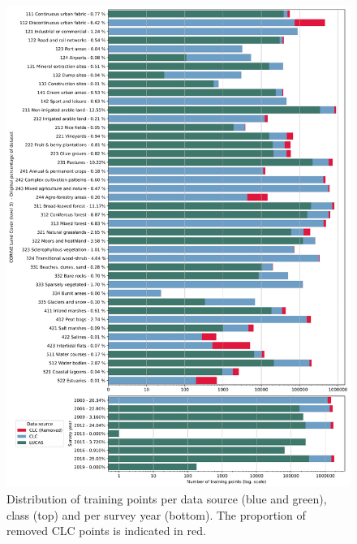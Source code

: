     \begin{figure}[!hp]
    \centering
        \includegraphics[width=1\textwidth]{figs_03/methods_dataset_countplot.png}
    \caption{Distribution of training points per data source (blue and green), class (top) and per survey year (bottom). The proportion of removed CLC points is indicated in red.}
    \label{fig:dataset_countplot}
    \end{figure}
    

